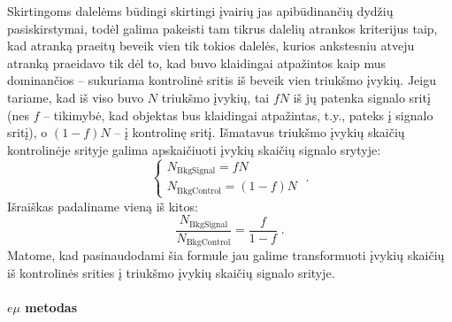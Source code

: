 \documentclass[a4paper, 12pt]{article}
\newlength\q
\begin{document}
\begin{enumerate}
Skirtingoms dalelėms būdingi skirtingi įvairių jas apibūdinančių dydžių pasiskirstymai, todėl galima pakeisti tam tikrus dalelių atrankos kriterijus taip, kad atranką praeitų beveik vien tik tokios dalelės, kurios ankstesniu atveju atranką praeidavo tik dėl to, kad buvo klaidingai atpažintos kaip mus dominančios -- sukuriama kontrolinė sritis iš beveik vien triukšmo įvykių. Jeigu tariame, kad iš viso buvo $N$ triukšmo įvykių, tai $fN$ iš jų patenka signalo sritį (nes $f$ -- tikimybė, kad objektas bus klaidingai atpažintas, t.y., pateks į signalo sritį), o $(1-f)N$ -- į kontrolinę sritį. Išmatavus triukšmo įvykių skaičių kontrolinėje srityje galima apskaičiuoti įvykių skaičių signalo srytyje:
\begin{equation}
\begin{cases}
N_{\mathrm{BkgSignal}}=fN\\
N_{\mathrm{BkgControl}}=(1-f)N
\end{cases} \; .
\label{eq:bkgsc}
\end{equation}
Išraiškas padaliname vieną iš kitos:
\begin{equation}
\frac{N_{\mathrm{BkgSignal}}}{N_{\mathrm{BkgControl}}}=\frac{f}{1-f} \; .
\label{eq:frBkg}
\end{equation}
Matome, kad pasinaudodami šia formule jau galime transformuoti įvykių skaičių iš kontrolinės srities į triukšmo įvykių skaičių signalo srityje.
\end{enumerate}

\vspace{-0.25cm}
\paragraph{$e\mu$ metodas\\}
\end{document}
